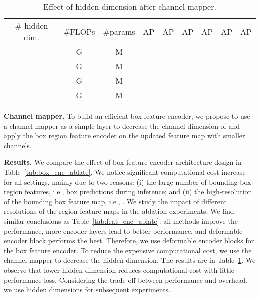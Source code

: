 \documentclass[10pt,twocolumn,letterpaper]{article}
\begin{document}
\begin{table}[t]
\begin{minipage}[t]{1\linewidth}
\vspace{2mm}
\centering
\setlength{\tabcolsep}{2pt}
\footnotesize
\renewcommand{\arraystretch}{1.2}
\resizebox{1.0\linewidth}{!}
{
\begin{tabular}{c|c|c|cccccc}
\# hidden dim. & \#FLOPs & \#params & AP & AP & AP & AP & AP & AP  \\
\shline
 &  G &  M &  &  &  &  &  &  \\
\rowcolor{gray!10} &  G &  M &  &  &  &  &  &  \\
 &  G &  M &  &  &  &  &  &  \\
 &  G &  M &  &  &  &  &  &  \\
\end{tabular}
}
\caption{\small{{
Effect of hidden dimension after channel mapper.}}
}
\label{tab:box_enc_ablate_channel_deformable}
\end{minipage}
\end{table}


\vspace{1mm}
\noindent\textbf{Channel mapper.}
To build an efficient box feature encoder, we propose to use a channel mapper as a simple  layer to decrease the channel dimension of  and apply the box region feature encoder on the updated feature map with smaller channels.


\vspace{1mm}
\noindent\textbf{Results.}
We compare the effect of box feature encoder architecture design in Table~\ref{tab:box_enc_ablate}. We notice significant computational cost increase for all settings, mainly due to two reasons: (i) the large number of bounding box region features, i.e.,  box predictions during inference; and (ii) the high-resolution of the bounding box feature map, i.e., . We study the impact of different resolutions of the region feature maps in the ablation experiments. We find similar conclusions as Table~\ref{tab:feat_enc_ablate}: all methods improve the performance, more encoder layers lead to better performance, and deformable encoder block performs the best. Therefore, we use deformable encoder blocks for the box feature encoder. To reduce the expensive computational cost, we use the channel mapper to decrease the hidden dimension. The results are in Table~\ref{tab:box_enc_ablate_channel_deformable}. We observe that lower hidden dimension reduces computational cost with little performance loss. Considering the trade-off between performance and overhead, we use  hidden dimensions for subsequent experiments.
\end{document}
